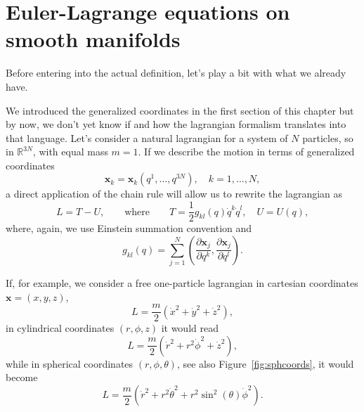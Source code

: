 \documentclass[english,fontsize=11pt,paper=a5,oneside]{scrbook}
\newcommand{\R}{\mathbb{R}}
\newcommand{\bx}{\bm{x}}
\theoremstyle{definition}
\begin{document}
\section{Euler-Lagrange equations on smooth manifolds}\label{sec:lagrangianonmanifold}

Before entering into the actual definition, let's play a bit with what we already have.

We introduced the generalized coordinates in the first section of this chapter but by now, we don't yet know if and how the lagrangian formalism translates into that language.
Let's consider a natural lagrangian for a system of $N$ particles, so in $\R^{3N}$, with equal mass $m=1$.
If we describe the motion in terms of generalized coordinates
\begin{equation}
    \bx_k = \bx_k(q^1, \ldots, q^{3N}), \quad k=1,\ldots,N,
\end{equation}
a direct application of the chain rule will allow us to rewrite the lagrangian as
\begin{equation}
    L = T - U, \qquad\mbox{where}\qquad T=\frac12 g_{kl}(q)\dot q^k \dot q^l, \quad U=U(q),
\end{equation}
where, again, we use Einstein summation convention and
\begin{equation}
    g_{kl} (q) = \sum_{j=1}^N \left(\frac{\partial\bx_j}{\partial q^k}, \frac{\partial \bx_j}{\partial q^l}\right).
\end{equation}

If, for example, we consider a free one-particle lagrangian in cartesian coordinates $\bx = (x,y,z)$,
\begin{equation}
    L = \frac m2 (\dot x^2 + \dot y^2 + \dot z^2),
\end{equation}
in cylindrical coordinates $(r,\phi,z)$ it would read
\begin{equation}
    L = \frac m2 (\dot r^2 + r^2 \dot \phi^2 + \dot z^2),
\end{equation}
while in spherical coordinates $(r,\phi,\theta)$, see also Figure~\ref{fig:sphcoords}, it would become
\begin{equation}
    L = \frac m2 (\dot r^2 + r^2 \dot \theta^2 + r^2 \sin^2(\theta) \dot \phi^2).
\end{equation}
\end{document}
